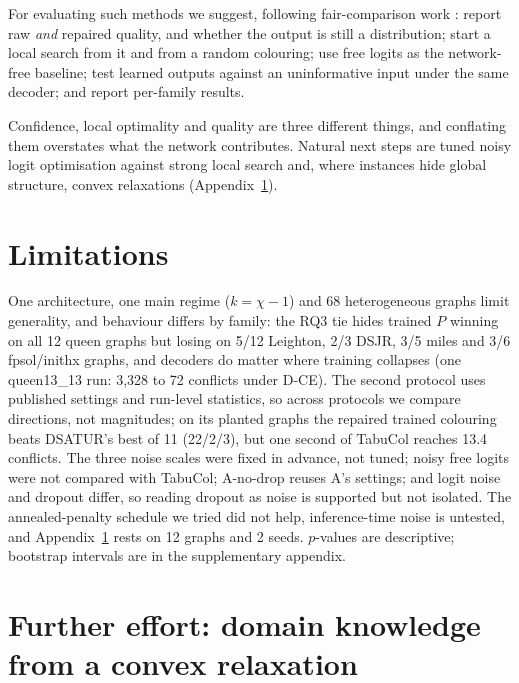 \documentclass[11pt]{article}
\begin{document}
For evaluating such methods we suggest, following fair-comparison work
\citep{errica2020fair,bechlerspeicher2025position}: report raw \emph{and}
repaired quality, and whether the output is still a distribution; start a
local search from it and from a random colouring;
use free logits as the network-free baseline; test learned outputs against an
uninformative input under the same decoder; and report per-family results.

Confidence, local optimality and quality are three different things, and
conflating them overstates what the network contributes. Natural next steps
are tuned noisy logit optimisation against strong local search and, where
instances hide global structure, convex relaxations
(Appendix~\ref{app:sdp}).

\section*{Limitations}

One architecture, one main regime ($k=\chi-1$) and 68 heterogeneous graphs
limit generality, and behaviour differs by family: the RQ3 tie hides trained
$P$ winning on all 12 queen graphs but losing on 5/12 Leighton, 2/3 DSJR, 3/5
miles and 3/6 fpsol/inithx graphs, and decoders do matter where training
collapses (one queen13\_13 run: 3{,}328 to 72 conflicts under D-CE). The
second protocol uses published settings and run-level statistics, so across
protocols we compare directions, not magnitudes; on its planted graphs the
repaired trained colouring beats DSATUR's best of 11 (22/2/3), but one second
of TabuCol reaches 13.4 conflicts.
The three noise scales were fixed in advance, not tuned; noisy free logits
were not compared with TabuCol; A-no-drop reuses A's settings; and logit
noise and dropout differ, so reading dropout as noise is supported but not
isolated. The annealed-penalty schedule we tried
\citep{ichikawa2024controlling} did not help, inference-time noise
\citep{colantonio2024efficient} is untested, and Appendix~\ref{app:sdp} rests
on 12 graphs and 2 seeds. $p$-values are descriptive; bootstrap intervals are
in the supplementary appendix.




\clearpage
\onecolumn
\raggedbottom
\appendix
\renewcommand{\thetable}{\thesection.\arabic{table}}
\setcounter{table}{0}

\section{Further effort: domain knowledge from a convex relaxation}
\label{app:sdp}
\end{document}
